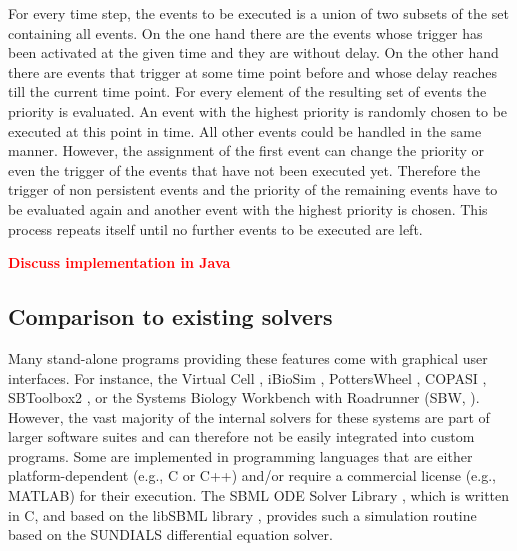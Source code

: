\documentclass[10pt]{bmc_article}
\newenvironment{bmcformat}{\baselineskip20pt\sloppy\setboolean{publ}{false}}{\baselineskip20pt\sloppy}
\newcommand{\TODO}[1]{\textcolor{red}{\textbf{#1}}}
\begin{document}
\begin{bmcformat}
For every time step, the events to be executed is a union of two subsets of the set containing all events.
On the one hand there are the events whose trigger has been activated at the given time and they are without delay. On the other hand there are events that trigger at some time point before and whose delay reaches till the current time point. For every element of the resulting set of events the priority is evaluated.
An event with the highest priority is randomly chosen to be executed at this point in time. All other events
could be handled in the same manner. However, the assignment of the first event can change the priority or even the trigger of the events that have not been executed yet. Therefore the trigger of non persistent 
events and the priority of the remaining events have to be evaluated again and another event with the highest priority is chosen. This process repeats itself until no further events to be executed are left.


\TODO{Discuss implementation in Java}

\subsection{Comparison to existing solvers}

Many stand-alone programs providing these features come with
graphical user interfaces.
For instance, the Virtual Cell \cite{Loew2001}, iBioSim \cite{Myers2009},
PottersWheel \cite{Maiwald2008}, COPASI \cite{Hoops2006}, SBToolbox2
\cite{SBT_Schmidt2006}, or the Systems Biology Workbench with Roadrunner (SBW, \cite{Bergmann06}). 
However, the vast majority of the internal solvers for these systems are part of
larger software suites and can therefore not be easily integrated into custom
programs. Some are implemented in programming languages that are either
platform-dependent (e.g., C or C++) and/or require a commercial license (e.g.,
MATLAB\texttrademark{}) for their execution.
The SBML ODE Solver Library \cite{Machne2006}, which is written in C,
and based on the libSBML library \cite{Bornstein2008}, 
provides such a simulation routine based on the SUNDIALS differential equation
solver.


\end{bmcformat}
\end{document}
